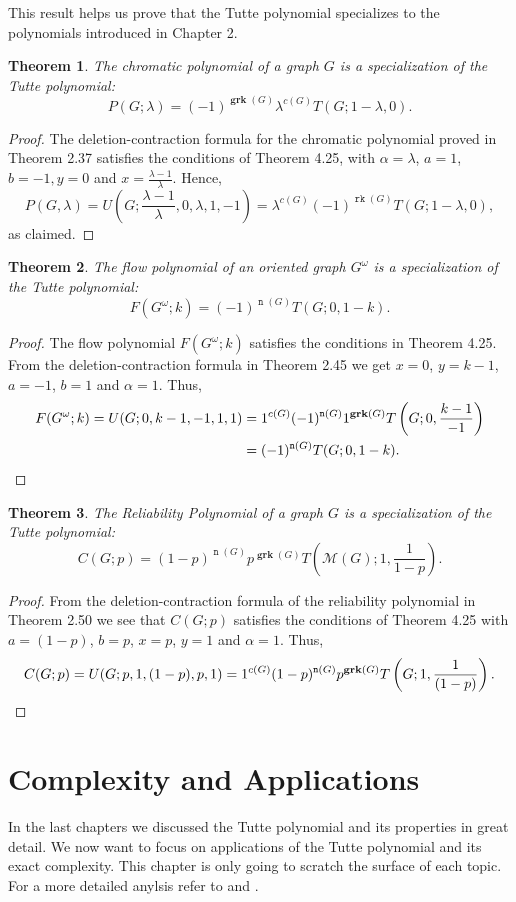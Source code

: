 \documentclass[12pt,a4paper, twoside, autooneside=false]{scrartcl}
\newtheorem{theorem}{Theorem}[section]
\theoremstyle{definition}
\theoremstyle{remark}
\numberwithin{equation}{section}
\DeclareMathOperator{\rk}{\mathtt{rk}}
\DeclareMathOperator{\n}{\mathtt{n}}
\newcommand{\M}{\mathcal{M}} %
\DeclareMathOperator{\grk}{\mathbf{grk}} %
\begin{document}
This result helps us prove that the Tutte polynomial specializes to the polynomials introduced in Chapter 2.
\begin{theorem}
The chromatic polynomial of a graph $G$ is a specialization of the Tutte polynomial:
\[
P(G;\lambda) = (-1)^{\grk(G)}\lambda^{c(G)}T(G; 1 - \lambda, 0).
\]
\end{theorem}
\begin{proof}
The deletion-contraction formula for the chromatic polynomial proved in Theorem 2.37 satisfies the conditions of Theorem 4.25, with $\alpha = \lambda$, $a = 1$, $b = -1, y = 0$ and $x = \frac{\lambda - 1}{\lambda}$. Hence,
\[
P(G, \lambda) = U\left(G; \frac{\lambda - 1}{\lambda}, 0, \lambda, 1, -1\right) = \lambda^{c(G)}(-1)^{\rk(G)} T(G;1 - \lambda, 0),
\]
as claimed. 
\end{proof}
\begin{theorem}
The flow polynomial of an oriented graph $G^\omega$ is a specialization of the Tutte polynomial: 
\[
F(G^\omega;k) = (-1)^{\n(G)}T(G; 0, 1 - k).
\]
\end{theorem}
\begin{proof} The flow polynomial $F(G^\omega; k)$ satisfies the conditions in Theorem 4.25. From the deletion-contraction formula in Theorem 2.45 we get $x = 0$, $y = k - 1$, $a = -1$, $b = 1$ and $\alpha = 1$. Thus,
\begin{align*}
F(G^\omega; k) = U(G;0, k - 1, -1, 1, 1) &= 1^{c(G)}(-1)^{\n(G)}1^{\grk(G)} T\left(G; 0, \frac{k - 1}{-1}\right) \\ &= (-1)^{\n(G)}T(G;0, 1 - k). \qedhere
\end{align*}
\end{proof}
\begin{theorem}
The Reliability Polynomial of a graph $G$ is a specialization of the Tutte polynomial: 
\[
C(G;p) = (1 - p)^{\n(G)}p^{\grk(G)}T(\M(G); 1,\frac{1}{1-p}).
\]
\end{theorem}
\begin{proof}
From the deletion-contraction formula of the reliability polynomial in Theorem 2.50 we see that $C(G;p)$ satisfies the conditions of Theorem 4.25 with $a = (1-p)$, $b = p$, $x = p$, $y = 1$ and $\alpha = 1$. Thus, 
\[
C(G;p) = U(G;p,1,(1-p),p,1) = 1^{c(G)}(1-p)^{\n(G)}p^{\grk(G)}T\left(G; 1, \frac{1}{(1-p)}\right).\qedhere
\]
\end{proof}
\newpage
\section{Complexity and Applications}
In the last chapters we discussed the Tutte polynomial and its properties in great detail. We now want to focus on applications of the Tutte polynomial and its exact complexity. This chapter is only going to scratch the surface of each topic. For a more detailed anylsis refer to \cite{ElMo2022} and \cite{GoRo2001}.
\end{document}
